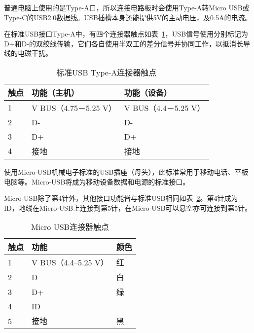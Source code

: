 普通电脑上使用的是Type-A口，所以连接电路板时会使用Type-A转Micro USB或Type-C的USB2.0数据线。USB插槽本身还能提供5V的主动电压，及0.5A的电流。

在标准USB接口Type-A中，有四个连接器触点如表~\ref{tab:USB-4}，USB信号使用分别标记为D+和D-的双绞线传输，它们各自使用半双工的差分信号并协同工作，以抵消长导线的电磁干扰。

\begin{table}[]
    \centering
    \begin{tabular}{@{}lll@{}}
    \toprule
    触点 & 功能（主机）             & 功能（设备）            \\ \midrule
    1  & V BUS（4.75－5.25 V） & V BUS（4.4－5.25 V） \\
    2  & D-                 & D-                \\
    3  & D+                 & D+                \\
    4  & 接地                 & 接地                \\ \bottomrule
    \end{tabular}
    \caption{标准USB Type-A连接器触点}
    \label{tab:USB-4}
\end{table}

使用Micro-USB机械电子标准的USB插座（母头），此标准常用于移动电话、平板电脑等。Micro-USB将成为移动设备数据和电源的标准接口。

Micro-USB除了第4针外，其他接口功能皆与标准USB相同如表~\ref{tab:MicroUSB}。第4针成为ID，地线在Micro-USB上连接到第5针，在Micro-USB可以悬空亦可连接到第5针。

\begin{table}[]
    \centering
    \begin{tabular}{@{}lll@{}}
    \toprule
    触点 & 功能                & 颜色 \\ \midrule
    1  & V BUS（4.4–5.25 V） & 红  \\
    2  & D−                & 白  \\
    3  & D+                & 绿  \\
    4  & ID                &    \\
    5  & 接地                & 黑 \\ \bottomrule
    \end{tabular}
    \caption{Micro USB连接器触点}
    \label{tab:MicroUSB}
\end{table}

